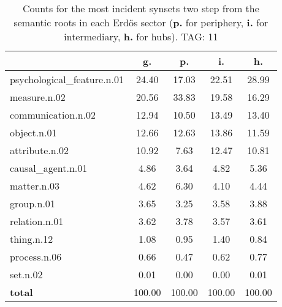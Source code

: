 \begin{table}[h!]
\begin{center}
\begin{tabular}{| l | c | c | c | c |}\hline
 & g. & p. & i. & h. \\\hline
psychological\_feature.n.01 & 24.40  & 17.03  & 22.51  & 28.99 \\\hline
measure.n.02 & 20.56  & 33.83  & 19.58  & 16.29 \\\hline
communication.n.02 & 12.94  & 10.50  & 13.49  & 13.40 \\\hline
object.n.01 & 12.66  & 12.63  & 13.86  & 11.59 \\\hline
attribute.n.02 & 10.92  & 7.63  & 12.47  & 10.81 \\\hline
causal\_agent.n.01 & 4.86  & 3.64  & 4.82  & 5.36 \\\hline
matter.n.03 & 4.62  & 6.30  & 4.10  & 4.44 \\\hline
group.n.01 & 3.65  & 3.25  & 3.58  & 3.88 \\\hline
relation.n.01 & 3.62  & 3.78  & 3.57  & 3.61 \\\hline
thing.n.12 & 1.08  & 0.95  & 1.40  & 0.84 \\\hline
process.n.06 & 0.66  & 0.47  & 0.62  & 0.77 \\\hline
set.n.02 & 0.01  & 0.00  & 0.00  & 0.01 \\\hline
{{\bf total}} & 100.00  & 100.00  & 100.00  & 100.00 \\\hline
\end{tabular}
\caption{Counts for the most incident synsets two step from the semantic roots in each Erd\"os sector ({\bf p.} for periphery, {\bf i.} for intermediary, {\bf h.} for hubs). TAG: 11}
\end{center}
\end{table}